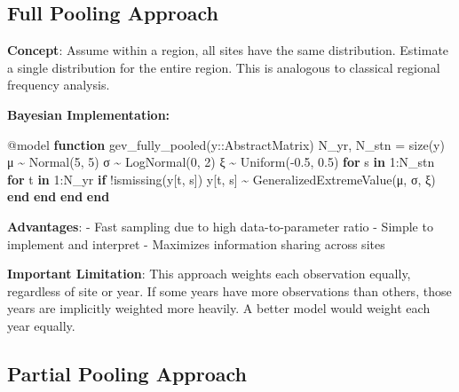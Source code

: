 \documentclass[
  letterpaper,
  DIV=11,
  numbers=noendperiod]{scrreprt}
\newenvironment{Shaded}{\begin{snugshade}}{\end{snugshade}}
\newcommand{\ControlFlowTok}[1]{\textcolor[rgb]{0.00,0.23,0.31}{\textbf{#1}}}
\newcommand{\DataTypeTok}[1]{\textcolor[rgb]{0.68,0.00,0.00}{#1}}
\newcommand{\FloatTok}[1]{\textcolor[rgb]{0.68,0.00,0.00}{#1}}
\newcommand{\FunctionTok}[1]{\textcolor[rgb]{0.28,0.35,0.67}{#1}}
\newcommand{\KeywordTok}[1]{\textcolor[rgb]{0.00,0.23,0.31}{\textbf{#1}}}
\newcommand{\NormalTok}[1]{\textcolor[rgb]{0.00,0.23,0.31}{#1}}
\newcommand{\OperatorTok}[1]{\textcolor[rgb]{0.37,0.37,0.37}{#1}}
\newcommand{\PreprocessorTok}[1]{\textcolor[rgb]{0.68,0.00,0.00}{#1}}
\begin{document}
\subsection{Full Pooling Approach}\label{full-pooling-approach}

\textbf{Concept}: Assume within a region, all sites have the same
distribution. Estimate a single distribution for the entire region. This
is analogous to classical regional frequency analysis.

\textbf{Bayesian Implementation:}

\begin{Shaded}
\begin{Highlighting}[]
\PreprocessorTok{@model} \KeywordTok{function} \FunctionTok{gev\_fully\_pooled}\NormalTok{(y}\OperatorTok{::}\DataTypeTok{AbstractMatrix}\NormalTok{)}
\NormalTok{    N\_yr, N\_stn }\OperatorTok{=} \FunctionTok{size}\NormalTok{(y)}
\NormalTok{    μ }\OperatorTok{\textasciitilde{}} \FunctionTok{Normal}\NormalTok{(}\FloatTok{5}\NormalTok{, }\FloatTok{5}\NormalTok{)}
\NormalTok{    σ }\OperatorTok{\textasciitilde{}} \FunctionTok{LogNormal}\NormalTok{(}\FloatTok{0}\NormalTok{, }\FloatTok{2}\NormalTok{)}
\NormalTok{    ξ }\OperatorTok{\textasciitilde{}} \FunctionTok{Uniform}\NormalTok{(}\OperatorTok{{-}}\FloatTok{0.5}\NormalTok{, }\FloatTok{0.5}\NormalTok{)}
    \ControlFlowTok{for}\NormalTok{ s }\KeywordTok{in} \FloatTok{1}\OperatorTok{:}\NormalTok{N\_stn}
        \ControlFlowTok{for}\NormalTok{ t }\KeywordTok{in} \FloatTok{1}\OperatorTok{:}\NormalTok{N\_yr}
            \ControlFlowTok{if}\NormalTok{ !}\FunctionTok{ismissing}\NormalTok{(y[t, s])}
\NormalTok{                y[t, s] }\OperatorTok{\textasciitilde{}} \FunctionTok{GeneralizedExtremeValue}\NormalTok{(μ, σ, ξ)}
            \ControlFlowTok{end}
        \ControlFlowTok{end}
    \ControlFlowTok{end}
\KeywordTok{end}
\end{Highlighting}
\end{Shaded}

\textbf{Advantages}: - Fast sampling due to high data-to-parameter ratio
- Simple to implement and interpret - Maximizes information sharing
across sites

\textbf{Important Limitation}: This approach weights each observation
equally, regardless of site or year. If some years have more
observations than others, those years are implicitly weighted more
heavily. A better model would weight each year equally.

\subsection{Partial Pooling Approach}\label{partial-pooling-approach}
\end{document}
